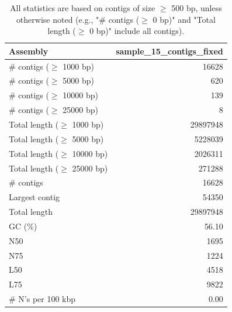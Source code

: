 \documentclass[12pt,a4paper]{article}
\begin{document}
\begin{table}[ht]
\begin{center}
\caption{All statistics are based on contigs of size $\geq$ 500 bp, unless otherwise noted (e.g., "\# contigs ($\geq$ 0 bp)" and "Total length ($\geq$ 0 bp)" include all contigs).}
\begin{tabular}{|l*{1}{|r}|}
\hline
Assembly & sample\_15\_contigs\_fixed \\ \hline
\# contigs ($\geq$ 1000 bp) & 16628 \\ \hline
\# contigs ($\geq$ 5000 bp) & 620 \\ \hline
\# contigs ($\geq$ 10000 bp) & 139 \\ \hline
\# contigs ($\geq$ 25000 bp) & 8 \\ \hline
Total length ($\geq$ 1000 bp) & 29897948 \\ \hline
Total length ($\geq$ 5000 bp) & 5228039 \\ \hline
Total length ($\geq$ 10000 bp) & 2026311 \\ \hline
Total length ($\geq$ 25000 bp) & 271288 \\ \hline
\# contigs & 16628 \\ \hline
Largest contig & 54350 \\ \hline
Total length & 29897948 \\ \hline
GC (\%) & 56.10 \\ \hline
N50 & 1695 \\ \hline
N75 & 1224 \\ \hline
L50 & 4518 \\ \hline
L75 & 9822 \\ \hline
\# N's per 100 kbp & 0.00 \\ \hline
\end{tabular}
\end{center}
\end{table}
\end{document}
